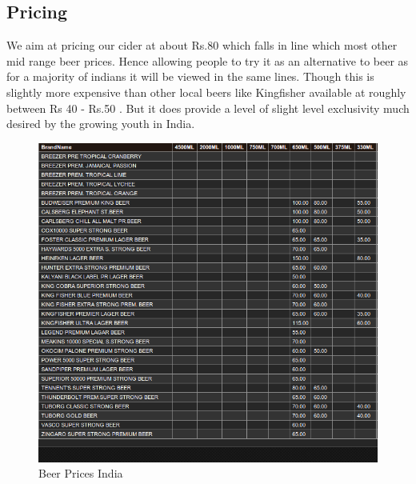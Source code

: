 \documentclass[11pt]{article}
\begin{document}
	\subsection{Pricing}
	We aim at pricing our cider at about Rs.80 which falls in line which most other mid range beer prices. Hence allowing people to try it as an alternative to beer as for a majority of indians it will be viewed in the same lines. Though this is slightly more expensive than other local beers like Kingfisher available at roughly between Rs 40 - Rs.50 . But it does provide a level of slight level exclusivity much desired by the growing youth in India.

	\begin{figure}[h!]
	\caption{Beer Prices India}
	\centering
	\includegraphics[width=\textwidth]{beerprices.png}
	\end{figure}
\end{document}
